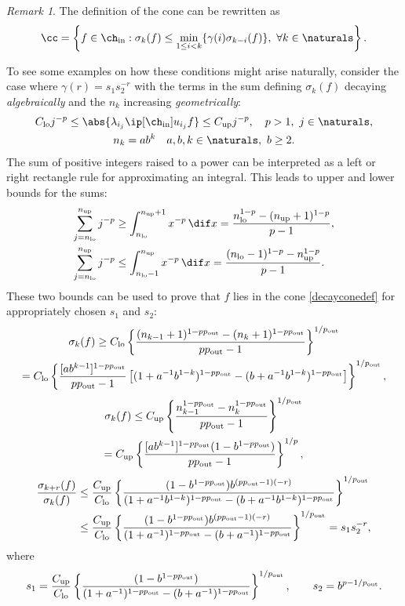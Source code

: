 \documentclass[final]{elsarticle}
\newcommand{\chin}{\ch_{\text{\rm{in}}}}
\newcommand{\pout}{p_{\text{\rm{out}}}}
\theoremstyle{definition}
\theoremstyle{remark}
\newtheorem{rem}{Remark}
\DeclareMathOperator{\up}{up}
\DeclareMathOperator{\lo}{lo}
\begin{document}
\begin{rem}
The definition of the cone can be rewritten as
\begin{equation}\label{coneredef}
\cc = \left\{ f \in \chin : \sigma_k(f) \le \min_{1 \le i < k}\{\gamma(i)\sigma_{k-i}(f)\}, \ \forall k \in \naturals \right\}.
\end{equation}
\end{rem}

To see some examples on how these conditions might arise naturally, consider the case where $\gamma(r)=s_1s_2^{-r}$ with the terms in the sum defining $\sigma_k(f)$ decaying \emph{algebraically} and the $n_k$ increasing \emph{geometrically}:
\begin{gather*}
C_{\lo} j^{-p} \le \abs{\lambda_{i_j} \ip[\chin]{u_{i_j}}{f}} \le C_{\up} j^{-p}, \quad  p>1, \ j \in \naturals, \\
n_k = a b^k  \quad a, b, k \in \naturals, \ b \ge 2.
\end{gather*}
The sum of positive integers raised to a power can be interpreted as a left or right rectangle rule for approximating an integral.  This leads to upper and lower bounds for the sums:
\begin{align*}
\sum_{j=n_{\lo}}^{n_{\up}} j^{-p}  & \ge \int_{n_{\lo}}^{n_{\up}+1} x^{-p}\, \dif x  = \frac{n_{\lo} ^{1-p} - (n_{\up}+1)^{1-p}}{p-1}, \\
\sum_{j=n_{\lo}}^{n_{\up}} j^{-p}  & \le \int_{n_{\lo}-1}^{n_{\up}} x^{-p}\, \dif x = \frac{(n_{\lo}-1) ^{1-p} - n_{\up}^{1-p}}{p-1}.
\end{align*}
These two bounds can be used to prove that $f$ lies in the cone \eqref{decayconedef} for appropriately chosen $s_1$ and $s_2$:
\begin{multline*}
\sigma_k(f) \ge C_{\lo} \left\{\frac{(n_{k-1}+1) ^{1-p\pout} - (n_{k}+1)^{1-p \pout}}{p \pout-1}\right\}^{1/\pout} \\
= C_{\lo} \left\{\frac{[ab^{k-1}]^{1-p \pout}}{p \pout-1} \left[(1+a^{-1}b^{1-k})^{1-p \pout} - (b+a^{-1}b^{1-k})^{1-p \pout}\right] \right\}^{1/\pout},
\end{multline*}
\begin{multline*}
\sigma_k(f) \le C_{\up}\left\{\frac{n_{k-1} ^{1-p \pout} - n_{k}^{1-p \pout}}{p \pout-1}\right\}^{1/\pout} \\
= C_{\up}\left\{\frac{[ab^{k-1}]^{1-p \pout} (1 - b^{1-p \pout})}{p \pout-1}\right\}^{1/p} ,
\end{multline*}
\begin{align*}
\frac{\sigma_{k+r}(f)}{\sigma_k(f)} &\le \frac{C_{\up}}  {C_{\lo}}
\left\{\frac{ (1 - b^{1-p \pout}) b^{(p \pout -1)(-r)} }  {(1+a^{-1}b^{1-k})^{1-p\pout} - (b+a^{-1}b^{1-k})^{1-p\pout}} \right\}^{1/\pout}\\
& \le \frac{C_{\up}}  {C_{\lo}}
\left\{\frac{(1 - b^{1-p\pout}) b^{(p \pout -1)(-r)} }  {(1+a^{-1})^{1-p\pout} - (b+a^{-1})^{1-p\pout}} \right\}^{1/\pout}   = s_1 s_2^{-r},
\end{align*}
where
\[
s_1 = \frac{ C_{\up}}  {C_{\lo}}\left\{\frac{(1 - b^{1-p\pout})}  {(1+a^{-1})^{1-p\pout} - (b+a^{-1})^{1-p\pout} } \right\}^{1/\pout}, \qquad s_2 = b^{p-1/\pout}.
\]
\end{document}
